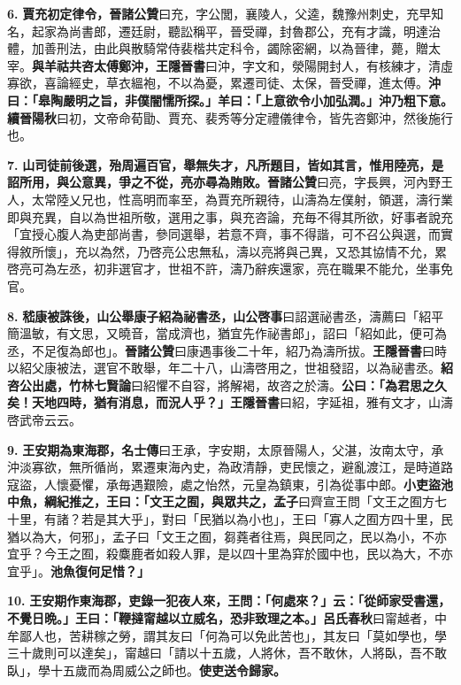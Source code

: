 \textbf{6.} \textbf{賈充初定律令，}{\footnotesize \textbf{晉諸公贊}曰充，字公閭，襄陵人，父逵，魏豫州刺史，充早知名，起家為尚書郎，遷廷尉，聽訟稱平，晉受禪，封魯郡公，充有才識，明達治體，加善刑法，由此與散騎常侍裴楷共定科令，蠲除密網，以為晉律，薨，贈太宰。}\textbf{與羊祜共咨太傅鄭沖，}{\footnotesize \textbf{王隱晉書}曰沖，字文和，滎陽開封人，有核練才，清虛寡欲，喜論經史，草衣縕袍，不以為憂，累遷司徒、太保，晉受禪，進太傅。}\textbf{沖曰：「皋陶嚴明之旨，非僕闇懦所探。」羊曰：「上意欲令小加弘潤。」沖乃粗下意。}{\footnotesize \textbf{續晉陽秋}曰初，文帝命荀勖、賈充、裴秀等分定禮儀律令，皆先咨鄭沖，然後施行也。}

\textbf{7.} \textbf{山司徒前後選，殆周遍百官，舉無失才，凡所題目，皆如其言，惟用陸亮，是詔所用，與公意異，爭之不從，亮亦尋為賄敗。}{\footnotesize \textbf{晉諸公贊}曰亮，字長興，河內野王人，太常陸乂兄也，性高明而率至，為賈充所親待，山濤為左僕射，領選，濤行業即與充異，自以為世祖所敬，選用之事，與充咨論，充毎不得其所欲，好事者說充「宜授心腹人為吏部尚書，參同選舉，若意不齊，事不得諧，可不召公與選，而實得敘所懷」，充以為然，乃啓亮公忠無私，濤以亮將與己異，又恐其協情不允，累啓亮可為左丞，初非選官才，世祖不許，濤乃辭疾還家，亮在職果不能允，坐事免官。}

\textbf{8.} \textbf{嵇康被誅後，山公舉康子紹為祕書丞，}{\footnotesize \textbf{山公啓事}曰詔選祕書丞，濤薦曰「紹平簡溫敏，有文思，又曉音，當成濟也，猶宜先作祕書郎」，詔曰「紹如此，便可為丞，不足復為郎也」。\textbf{晉諸公贊}曰康遇事後二十年，紹乃為濤所拔。\textbf{王隱晉書}曰時以紹父康被法，選官不敢舉，年二十八，山濤啓用之，世祖發詔，以為祕書丞。}\textbf{紹咨公出處，}{\footnotesize \textbf{竹林七賢論}曰紹懼不自容，將解褐，故咨之於濤。}\textbf{公曰：「為君思之久矣！天地四時，猶有消息，而況人乎？」}{\footnotesize \textbf{王隱晉書}曰紹，字延祖，雅有文才，山濤啓武帝云云。}

\textbf{9.} \textbf{王安期為東海郡，}{\footnotesize \textbf{名士傳}曰王承，字安期，太原晉陽人，父湛，汝南太守，承沖淡寡欲，無所循尚，累遷東海內史，為政清靜，吏民懷之，避亂渡江，是時道路寇盜，人懷憂懼，承毎遇艱險，處之怡然，元皇為鎮東，引為從事中郎。}\textbf{小吏盜池中魚，綱紀推之，王曰：「文王之囿，與眾共之，}{\footnotesize \textbf{孟子}曰齊宣王問「文王之囿方七十里，有諸？若是其大乎」，對曰「民猶以為小也」，王曰「寡人之囿方四十里，民猶以為大，何邪」，孟子曰「文王之囿，芻蕘者往焉，與民同之，民以為小，不亦宜乎？今王之囿，殺麋鹿者如殺人罪，是以四十里為穽於國中也，民以為大，不亦宜乎」。}\textbf{池魚復何足惜？」}

\textbf{10.} \textbf{王安期作東海郡，吏錄一犯夜人來，王問：「何處來？」云：「從師家受書還，不覺日晩。」王曰：「鞭撻甯越以立威名，恐非致理之本。」}{\footnotesize \textbf{呂氏春秋}曰甯越者，中牟鄙人也，苦耕稼之勞，謂其友曰「何為可以免此苦也」，其友曰「莫如學也，學三十歲則可以達矣」，甯越曰「請以十五歲，人將休，吾不敢休，人將臥，吾不敢臥」，學十五歲而為周威公之師也。}\textbf{使吏送令歸家。}


